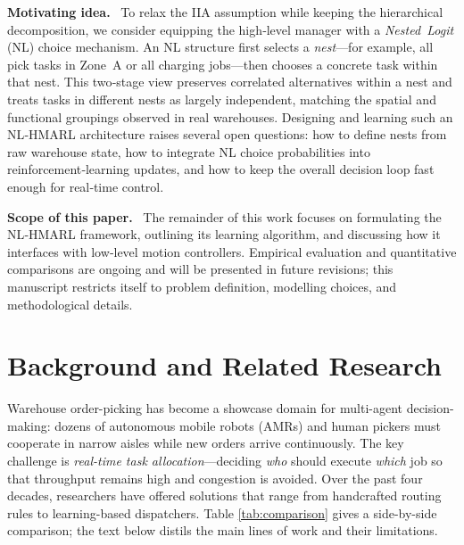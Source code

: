 \documentclass[journal]{IEEEtran}
\begin{document}
\vspace{2pt}
\textbf{Motivating idea.} %
To relax the IIA assumption while keeping the hierarchical decomposition, we consider equipping the high‑level manager with a \emph{Nested Logit} (NL) choice mechanism.%
An NL structure first selects a \textit{nest}—for example, all pick tasks in Zone A or all charging jobs—then chooses a concrete task within that nest.%
This two‑stage view preserves correlated alternatives within a nest and treats tasks in different nests as largely independent, matching the spatial and functional groupings observed in real warehouses.%
Designing and learning such an NL‑HMARL architecture raises several open questions: how to define nests from raw warehouse state, how to integrate NL choice probabilities into reinforcement‑learning updates, and how to keep the overall decision loop fast enough for real‑time control.

\vspace{2pt}
\textbf{Scope of this paper.} %
The remainder of this work focuses on formulating the NL‑HMARL framework, outlining its learning algorithm, and discussing how it interfaces with low‑level motion controllers.%
Empirical evaluation and quantitative comparisons are ongoing and will be presented in future revisions; this manuscript restricts itself to problem definition, modelling choices, and methodological details.

\section{Background and Related Research}

Warehouse order-picking has become a showcase domain for multi-agent decision-making: dozens of autonomous mobile robots (AMRs) and human pickers must cooperate in narrow aisles while new orders arrive continuously.  The key challenge is \emph{real-time task allocation}—deciding \textit{who} should execute \textit{which} job so that throughput remains high and congestion is avoided.  Over the past four decades, researchers have offered solutions that range from handcrafted routing rules to learning-based dispatchers.  Table \ref{tab:comparison} gives a side-by-side comparison; the text below distils the main lines of work and their limitations.
\end{document}

